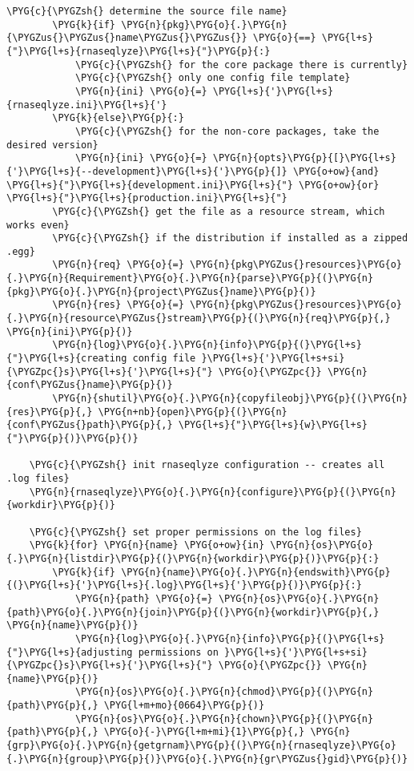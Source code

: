 \begin{Verbatim}[commandchars=\\\{\}]
        \PYG{c}{\PYGZsh{} determine the source file name}
        \PYG{k}{if} \PYG{n}{pkg}\PYG{o}{.}\PYG{n}{\PYGZus{}\PYGZus{}name\PYGZus{}\PYGZus{}} \PYG{o}{==} \PYG{l+s}{"}\PYG{l+s}{rnaseqlyze}\PYG{l+s}{"}\PYG{p}{:}
            \PYG{c}{\PYGZsh{} for the core package there is currently}
            \PYG{c}{\PYGZsh{} only one config file template}
            \PYG{n}{ini} \PYG{o}{=} \PYG{l+s}{'}\PYG{l+s}{rnaseqlyze.ini}\PYG{l+s}{'}
        \PYG{k}{else}\PYG{p}{:}
            \PYG{c}{\PYGZsh{} for the non-core packages, take the desired version}
            \PYG{n}{ini} \PYG{o}{=} \PYG{n}{opts}\PYG{p}{[}\PYG{l+s}{'}\PYG{l+s}{--development}\PYG{l+s}{'}\PYG{p}{]} \PYG{o+ow}{and} \PYG{l+s}{"}\PYG{l+s}{development.ini}\PYG{l+s}{"} \PYG{o+ow}{or} \PYG{l+s}{"}\PYG{l+s}{production.ini}\PYG{l+s}{"}
        \PYG{c}{\PYGZsh{} get the file as a resource stream, which works even}
        \PYG{c}{\PYGZsh{} if the distribution if installed as a zipped .egg}
        \PYG{n}{req} \PYG{o}{=} \PYG{n}{pkg\PYGZus{}resources}\PYG{o}{.}\PYG{n}{Requirement}\PYG{o}{.}\PYG{n}{parse}\PYG{p}{(}\PYG{n}{pkg}\PYG{o}{.}\PYG{n}{project\PYGZus{}name}\PYG{p}{)}
        \PYG{n}{res} \PYG{o}{=} \PYG{n}{pkg\PYGZus{}resources}\PYG{o}{.}\PYG{n}{resource\PYGZus{}stream}\PYG{p}{(}\PYG{n}{req}\PYG{p}{,} \PYG{n}{ini}\PYG{p}{)}
        \PYG{n}{log}\PYG{o}{.}\PYG{n}{info}\PYG{p}{(}\PYG{l+s}{"}\PYG{l+s}{creating config file }\PYG{l+s}{'}\PYG{l+s+si}{\PYGZpc{}s}\PYG{l+s}{'}\PYG{l+s}{"} \PYG{o}{\PYGZpc{}} \PYG{n}{conf\PYGZus{}name}\PYG{p}{)}
        \PYG{n}{shutil}\PYG{o}{.}\PYG{n}{copyfileobj}\PYG{p}{(}\PYG{n}{res}\PYG{p}{,} \PYG{n+nb}{open}\PYG{p}{(}\PYG{n}{conf\PYGZus{}path}\PYG{p}{,} \PYG{l+s}{"}\PYG{l+s}{w}\PYG{l+s}{"}\PYG{p}{)}\PYG{p}{)}

    \PYG{c}{\PYGZsh{} init rnaseqlyze configuration -- creates all .log files}
    \PYG{n}{rnaseqlyze}\PYG{o}{.}\PYG{n}{configure}\PYG{p}{(}\PYG{n}{workdir}\PYG{p}{)}

    \PYG{c}{\PYGZsh{} set proper permissions on the log files}
    \PYG{k}{for} \PYG{n}{name} \PYG{o+ow}{in} \PYG{n}{os}\PYG{o}{.}\PYG{n}{listdir}\PYG{p}{(}\PYG{n}{workdir}\PYG{p}{)}\PYG{p}{:}
        \PYG{k}{if} \PYG{n}{name}\PYG{o}{.}\PYG{n}{endswith}\PYG{p}{(}\PYG{l+s}{'}\PYG{l+s}{.log}\PYG{l+s}{'}\PYG{p}{)}\PYG{p}{:}
            \PYG{n}{path} \PYG{o}{=} \PYG{n}{os}\PYG{o}{.}\PYG{n}{path}\PYG{o}{.}\PYG{n}{join}\PYG{p}{(}\PYG{n}{workdir}\PYG{p}{,} \PYG{n}{name}\PYG{p}{)}
            \PYG{n}{log}\PYG{o}{.}\PYG{n}{info}\PYG{p}{(}\PYG{l+s}{"}\PYG{l+s}{adjusting permissions on }\PYG{l+s}{'}\PYG{l+s+si}{\PYGZpc{}s}\PYG{l+s}{'}\PYG{l+s}{"} \PYG{o}{\PYGZpc{}} \PYG{n}{name}\PYG{p}{)}
            \PYG{n}{os}\PYG{o}{.}\PYG{n}{chmod}\PYG{p}{(}\PYG{n}{path}\PYG{p}{,} \PYG{l+m+mo}{0664}\PYG{p}{)}
            \PYG{n}{os}\PYG{o}{.}\PYG{n}{chown}\PYG{p}{(}\PYG{n}{path}\PYG{p}{,} \PYG{o}{-}\PYG{l+m+mi}{1}\PYG{p}{,} \PYG{n}{grp}\PYG{o}{.}\PYG{n}{getgrnam}\PYG{p}{(}\PYG{n}{rnaseqlyze}\PYG{o}{.}\PYG{n}{group}\PYG{p}{)}\PYG{o}{.}\PYG{n}{gr\PYGZus{}gid}\PYG{p}{)}


\end{Verbatim}
